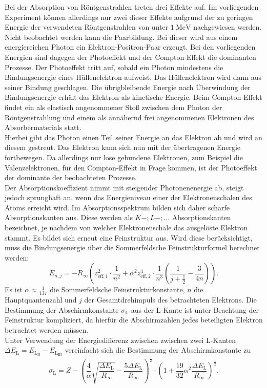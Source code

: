 Bei der Absorption von Röntgenstrahlen treten drei Effekte auf. Im vorliegenden Experiment können allerdings nur zwei dieser Effekte aufgrund der zu geringen Energie der verwendeten Röntgenstrahlen von unter $\SI{1}{\mega\electronvolt}$ nachgewiesen werden.
Nicht beobachtet werden kann die Paarbildung. Bei dieser wird aus einem energiereichen Photon ein Elektron-Positron-Paar erzeugt.
Bei den vorliegenden Energien sind dagegen der Photoeffekt und der Compton-Effekt die dominanten Prozesse.
Der Photoeffekt tritt auf, sobald ein Photon mindestens die Bindungsenergie eines Hüllenelektron aufweist.
Das Hüllenelektron wird dann aus seiner Bindung geschlagen. Die übrigbleibende Energie nach Überwindung der Bindungsenergie erhält das Elektron als kinetische Energie.
Beim Compton-Effekt findet ein als elastisch angenommener Stoß zwischen dem Photon der Röntgenstrahlung und einem als annähernd frei angenommenen Elektronen des Absorbermaterials statt.\\
Hierbei gibt das Photon einen Teil seiner Energie an das Elektron ab und wird an diesem gestreut.
Das Elektron kann sich nun mit der übertragenen Energie fortbewegen.
Da allerdings nur lose gebundene Elektronen, zum Beispiel die Valenzelektronen, für den Compton-Effekt in Frage kommen, ist der Photoeffekt der dominante der beobachteten Prozesse.\\
Der Absorptionskoeffizient nimmt mit steigender Photonenenergie ab, steigt jedoch sprunghaft an, wenn das Energieniveau einer der Elektronenschalen des Atoms erreicht wird.
Im Absorptionsspektrum bilden sich daher scharfe Absorptionskanten aus. Diese werden als $K-;L-;...$ Absorptionskanten bezeichnet, je nachdem von welcher Elektronenschale das ausgelöste Elektron stammt.
Es bildet sich erneut eine Feinstruktur aus. Wird diese berücksichtigt, muss die Bindungsenergie über die Sommerfeldsche Feinstrukturformel berechnet werden:
\begin{equation}
  E_{n,j}=-R_\infty  \left(z_\mathrm{eff,1}^2 \cdot \frac{1}{n^2}+\alpha^2 z_\mathrm{eff,2}^4 \cdot \frac{1}{n^3}\left(\frac{1}{j+\frac{1}{2}}-\frac{3}{4n}\right)\right)\text{.}
\end{equation}
Es ist $\alpha \approx \frac{1}{137}$ die Sommerfeldsche Feinstrukturkonstante, $n$ die Hauptquantenzahl und $j$ der Gesamtdrehimpuls des betrachteten Elektrons.
Die Bestimmung der Abschirmkonstante $\sigma_\mathrm{L}$ aus der L-Kante ist unter Beachtung der Feinstruktur kompliziert, da hierfür die Abschirmzahlen jedes beteiligten Elektron betrachtet werden müssen.\\
Unter Verwendung der Energiedifferenz zwischen zwischen zwei L-Kanten ${\Delta E_\mathrm{L}=E_\mathrm{L_\mathrm{II}}-E_\mathrm{L_\mathrm{III}}}$ vereinfacht sich die Bestimmung der Abschirmkonstante zu
\begin{equation}
	\label{eqn:goldi}
  \sigma_{\mathrm{L}}=Z-\left(\frac{4}{\alpha}\sqrt{\frac{\Delta E_\mathrm{L}}{R_\infty}}-\frac{5\Delta E_\mathrm{L}}{R_\infty}\right)^{\frac{1}{2}}\cdot \left(1+\frac{19}{32}\alpha^2\frac{\Delta E_\mathrm{L}}{R_\infty}\right)^{\frac{1}{2}} \text{.}
\end{equation}

